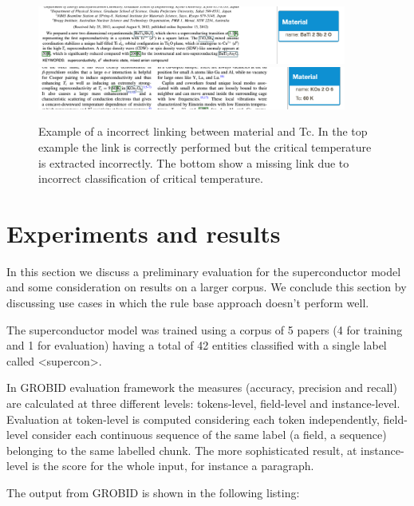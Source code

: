 \documentclass{article}[a4]
\begin{document}
\begin{figure}[h]
    \centering
    \includegraphics[width=4in]{example-bad1} 
    \includegraphics[width=4in]{example-bad2}
    \caption{Example of a incorrect linking between material and Tc. In the top example the link is correctly performed but the critical temperature is extracted incorrectly. The bottom show a missing link due to incorrect classification of critical temperature.}
    \label{fig:example-not-working}
\end{figure}

\section{Experiments and results}
\label{sec:experiments-results}

In this section we discuss a preliminary evaluation for the superconductor model  and some consideration on results on a larger corpus. We conclude this section by discussing use cases in which the rule base approach doesn't perform well. 

The superconductor model was trained using a corpus of 5 papers (4 for training and 1 for evaluation) having a total of 42 entities classified with a single label called  \textless supercon\textgreater.

In GROBID evaluation framework the measures (accuracy, precision and recall) are calculated at three different levels: tokens-level, field-level and instance-level. 
Evaluation at token-level is computed considering each token independently, field-level consider each continuous sequence of the same label (a field, a sequence) belonging to the same labelled chunk. The more sophisticated result, at instance-level is the score for the whole input, for instance a paragraph.

The output from GROBID is shown in the following listing: 
\end{document}
